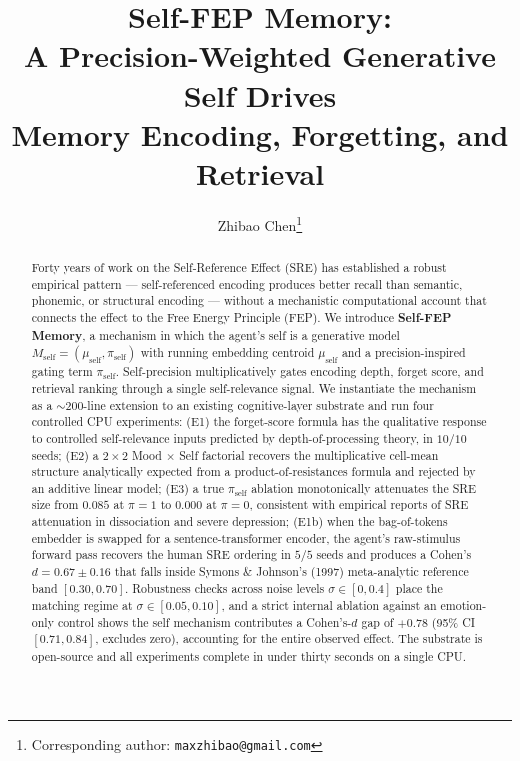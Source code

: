 \documentclass[10pt]{article}
\title{\textbf{Self-FEP Memory:\\
A Precision-Weighted Generative Self Drives\\
Memory Encoding, Forgetting, and Retrieval}}
\author[1]{Zhibao Chen\thanks{Corresponding author: \texttt{maxzhibao@gmail.com}}}
\affil[1]{Huatai Securities, Nanjing, China}
\date{}
\begin{document}
\maketitle

\begin{abstract}
\noindent
Forty years of work on the Self-Reference Effect (SRE) has established a
robust empirical pattern --- self-referenced encoding produces better
recall than semantic, phonemic, or structural encoding --- without a
mechanistic computational account that connects the effect to the Free
Energy Principle (FEP).
We introduce \textbf{Self-FEP Memory}, a mechanism in which the agent's
self is a generative model $M_{\text{self}} = (\mu_{\text{self}},
\pi_{\text{self}})$ with running embedding centroid $\mu_{\text{self}}$
and a precision-inspired gating term $\pi_{\text{self}}$.
Self-precision multiplicatively gates encoding depth, forget score, and
retrieval ranking through a single self-relevance signal.
We instantiate the mechanism as a $\sim$200-line extension to an existing
cognitive-layer substrate and run four controlled CPU experiments:
(E1) the forget-score formula has the qualitative response to controlled
self-relevance inputs predicted by depth-of-processing theory, in $10/10$
seeds;
(E2) a $2{\times}2$ Mood$\,\times\,$Self factorial recovers the
multiplicative cell-mean structure analytically expected from a
product-of-resistances formula and rejected by an additive linear model;
(E3) a true $\pi_{\text{self}}$ ablation monotonically attenuates the SRE
size from $0.085$ at $\pi{=}1$ to $0.000$ at $\pi{=}0$, consistent with
empirical reports of SRE attenuation in dissociation and severe depression;
(E1b) when the bag-of-tokens embedder is swapped for a sentence-transformer
encoder, the agent's raw-stimulus forward pass recovers the human SRE
ordering in $5/5$ seeds and produces a Cohen's $d = 0.67 \pm 0.16$ that
falls inside Symons \& Johnson's (1997) meta-analytic reference band
$[0.30, 0.70]$.
Robustness checks across noise levels $\sigma \in [0, 0.4]$ place
the matching regime at $\sigma \in [0.05, 0.10]$, and a strict
internal ablation against an emotion-only control shows the self
mechanism contributes a Cohen's-$d$ gap of $+0.78$ (95\% CI
$[0.71, 0.84]$, excludes zero), accounting for the entire observed
effect.
The substrate is open-source and all experiments complete in
under thirty seconds on a single CPU.
\end{abstract}


\FloatBarrier

\FloatBarrier

\FloatBarrier

\FloatBarrier

\FloatBarrier

\FloatBarrier

\FloatBarrier




\appendix

\end{document}
